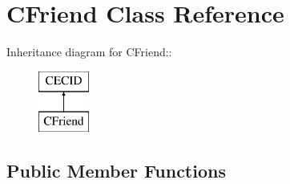 \section{CFriend Class Reference}
\label{classCFriend}
Inheritance diagram for CFriend::\begin{figure}[H]
\begin{center}
\leavevmode
\includegraphics[height=2cm]{classCFriend}
\end{center}
\end{figure}
\subsection*{Public Member Functions}
